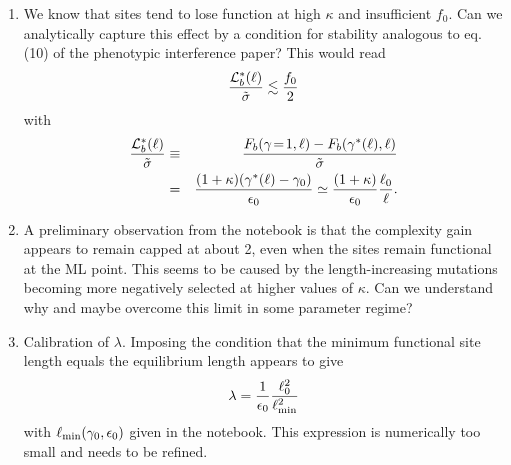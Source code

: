 \documentclass[10pt,a4paper]{article}
\newcommand{\ep}{\epsilon}
\newcommand{\EQ}{\begin{equation}}
\newcommand{\EE}{\end{equation}}
\newcommand{\EQA}{\begin{eqnarray}}
\newcommand{\EEA}{\end{eqnarray}}
\begin{document}
{\begin{enumerate}
\begin{itemize}
\item Binding free energy gap $\Delta G$ (in units of $k_B T$). Reasonable values: $\Delta G \gtrsim 6$. 

\item Functional binding length $\ell_0$ (excess number of binding positions per site compared to average random sequence),  
\EQ
\ell_0 = \frac{\Delta G}{\ep_0}, 
\EE
where $\ep_0 = \Delta \Delta G$ is the average free energy effect per mutation. Reasonable values $\ep_0 \sim 1$ (in units of $k_B T$). Smaller $\ep_0$ decrease curvature effects in the fitness landscape. 

\item Fitness effect per site, $f_0$. Reasonable values: $f_0 \gtrsim 10$. Smaller values of $f_0$ increase the probability of function loss (in particular, at high $\kappa$), larger values increase curvature effects in the fitness landscape. 
\end{itemize}

The constraint selection coefficient $\lambda$ is not independent, but is to be tuned so that equilibrium sites are close to the minimal functional length (to be implemented in notebook). 

\item We know that sites tend to lose function at high $\kappa$ and insufficient $f_0$. Can we analytically capture this effect by a condition for stability analogous to eq. (10) of the phenotypic interference paper? This would read 
\EQ
\frac{{\cal L}^*_b (\ell)}{\tilde \sigma} \lesssim \frac{f_0}{2}
\EE
with 
\EQA
\frac{{\cal L}^*_b (\ell)}{\tilde \sigma} & \equiv & \frac{F_b (\gamma \!=\! 1, \ell) - F_b (\gamma^*(\ell), \ell)}{\tilde \sigma} 
\nonumber 
\\
& = & \frac{(1 + \kappa)(\gamma^* (\ell) - \gamma_0)}{\ep_0} \simeq \frac{(1 + \kappa)}{\ep_0} \frac{\ell_0}{\ell}. 
\EEA

\item A preliminary observation from the notebook is that the complexity gain appears to remain capped at about 2, even when the sites remain functional at the ML point. This seems to be caused by the length-increasing mutations becoming more negatively selected at higher values of $\kappa$. Can we understand why and maybe overcome this limit in some parameter regime? 

\item Calibration of $\lambda$. Imposing the condition that the minimum functional site length equals the equilibrium length appears to give
\EQ
\lambda = \frac{1}{\ep_0} \frac{\ell_0^2}{\ell_{\rm min }^2 }
\EE
with $\ell_{\rm min} (\gamma_0, \ep_0)$ given in the notebook. This expression is numerically too small and needs to be refined. 
\end{enumerate}


}
\end{document}
